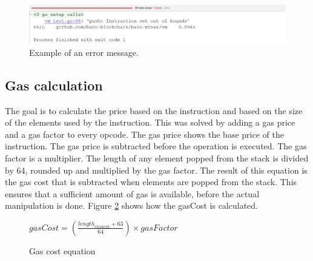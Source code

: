 \begin{figure}[H]
	\begin{center}
	\includegraphics[width=\textwidth]{./images/push-test-failure}
	\caption{Example of an error message.}
	\label{pushtestfailure}
	\end{center}
\end{figure}

\subsection{Gas calculation}
The goal is to calculate the price based on the instruction and based on the size of the elements used by the instruction. This was solved by adding a gas price and a gas factor to every opcode. The gas price shows the base price of the instruction. The gas price is subtracted before the operation is executed. The gas factor is a multiplier. The length of any element popped from the stack is divided by 64, rounded up and multiplied by the gas factor. The result of this equation is the gas cost that is subtracted when elements are popped from the stack. This ensures that a sufficient amount of gas is available, before the actual manipulation is done. Figure \ref{gas_factor_calc} shows how the gasCost is calculated.

\begin{figure}[thp]%
    	\centering
		$
		gasCost=\left( \frac { { length }_{ element }+63 }{ 64 }  \right) \times gasFactor
		$
		\caption{Gas cost equation}
		\label{gas_factor_calc}
\end{figure}

